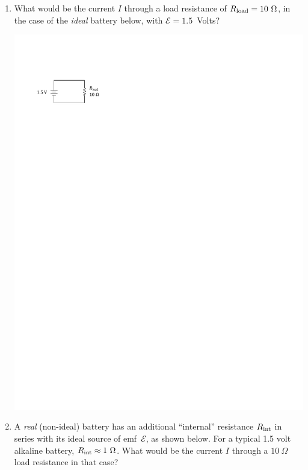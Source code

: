 \begin{enumerate}[labparts]
\item What would be the current $I$ through a load resistance of $R_{\rm load}=10~\Omega$, in the case of the \textit{ideal} battery below, with $\mathcal{E}=1.5$~Volts?

\bigskip
\includegraphics{resistance_ideal_meters/ideal_battery.pdf}
\bigskip

\item A \textit{real} (non-ideal) battery has an additional ``internal'' resistance $R_{\rm int}$ in series with its ideal source of emf~$\mathcal{E}$, as shown below.  For a typical 1.5 volt alkaline battery, $R_{\rm int}\approx 1~\Omega$.  What would be the current $I$ through a $10~\Omega$ load resistance in that case?


\end{enumerate}
